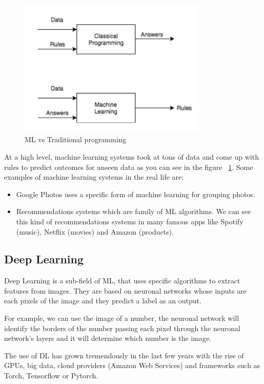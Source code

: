 \begin{figure}[H]
\centering
\includegraphics[width=0.8\textwidth]{./figures/ml-structure}
\caption{ML vs Traditional programming}
\label{fig:classicalvsmachinelearning}
\end{figure}

At a high level, machine learning systems took at tons of data and come up with rules to predict outcomes for unseen data as you can see in the figure ~\ref{fig:classicalvsmachinelearning}. 
Some examples of machine learning systems in the real life are:

\begin{itemize}
\item Google Photos uses a specific form of machine learning for grouping photos.
\item Recommendations systems which are family of ML algorithms. We can see this kind of recommendations systems in many famous apps like Spotify (music), Netflix (movies) and Amazon (products).
\end{itemize}

\subsection[Deep Learning]{Deep Learning}
Deep Learning is a sub-field of ML, that uses specific algorithms to extract features from images. They are based on neuronal networks whose inputs are each pixels of the image and they predict a label as an output.

For example, we can use the image of a number, the neuronal network will identify the borders of the number passing each pixel through the neuronal network's layers and it will determine which number is the image.

The use of DL has grown tremendously in the last few years with the rise of GPUs, big data, cloud providers (Amazon Web Services) and frameworks such as Torch, Tensorflow or Pytorch.

